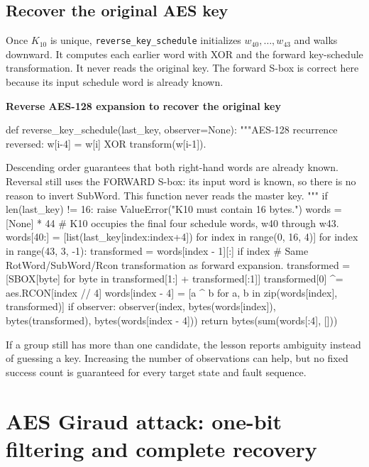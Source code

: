 \subsection{Recover the original AES key}
Once $K_{10}$ is unique, \texttt{reverse\_\allowbreak{}key\_\allowbreak{}schedule} initializes $w_{40},\ldots,w_{43}$ and walks downward. It computes each earlier word with XOR and the forward key-schedule transformation. It never reads the original key. The forward S-box is correct here because its input schedule word is already known.
\par\smallskip\noindent\textbf{Reverse AES-128 expansion to recover the original key}\par
\begin{lightcode}
def reverse_key_schedule(last_key, observer=None):
    """AES-128 recurrence reversed: w[i-4] = w[i] XOR transform(w[i-1]).

    Descending order guarantees that both right-hand words are already known.
    Reversal still uses the FORWARD S-box: its input word is known, so there
    is no reason to invert SubWord. This function never reads the master key.
    """
    if len(last_key) != 16:
        raise ValueError("K10 must contain 16 bytes.")
    words = [None] * 44
    # K10 occupies the final four schedule words, w40 through w43.
    words[40:] = [list(last_key[index:index+4]) for index in range(0, 16, 4)]
    for index in range(43, 3, -1):
        transformed = words[index - 1][:]
        if index %
            # Same RotWord/SubWord/Rcon transformation as forward expansion.
            transformed = [SBOX[byte] for byte in transformed[1:] + transformed[:1]]
            transformed[0] ^= aes.RCON[index // 4]
        words[index - 4] = [a ^ b for a, b in zip(words[index], transformed)]
        if observer:
            observer(index, bytes(words[index]), bytes(transformed), bytes(words[index - 4]))
    return bytes(sum(words[:4], []))
\end{lightcode}

If a group still has more than one candidate, the lesson reports ambiguity instead of guessing a key. Increasing the number of observations can help, but no fixed success count is guaranteed for every target state and fault sequence.

\section{AES Giraud attack: one-bit filtering and complete recovery}
